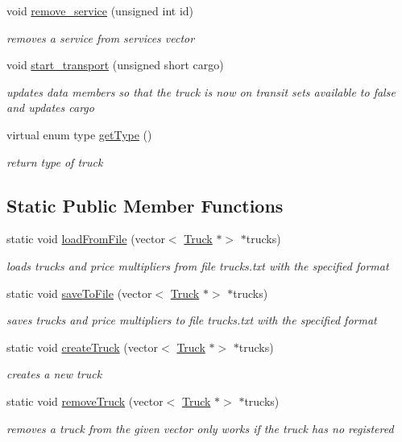 \begin{DoxyCompactItemize}
void \hyperlink{class_truck_a0abc7397fd6dba0eeeb2b5ae3e225fd1}{remove\+\_\+service} (unsigned int id)
\begin{DoxyCompactList}\small\item\em removes a service from services vector \end{DoxyCompactList}\item 
void \hyperlink{class_truck_aca68ecb83bcdc73de6bd381dccb70e4d}{start\+\_\+transport} (unsigned short cargo)
\begin{DoxyCompactList}\small\item\em updates data members so that the truck is now on transit sets available to false and updates cargo \end{DoxyCompactList}\item 
virtual enum type \hyperlink{class_truck_a24406caf4d09be7f3eff069ce6bc015b}{get\+Type} ()
\begin{DoxyCompactList}\small\item\em return type of truck \end{DoxyCompactList}\end{DoxyCompactItemize}
\subsection*{Static Public Member Functions}
\begin{DoxyCompactItemize}
\item 
static void \hyperlink{class_truck_ae2d129e4cdd6760feee9a81421d40e17}{load\+From\+File} (vector$<$ \hyperlink{class_truck}{Truck} $\ast$$>$ $\ast$trucks)
\begin{DoxyCompactList}\small\item\em loads trucks and price multipliers from file trucks.\+txt with the specified format \end{DoxyCompactList}\item 
static void \hyperlink{class_truck_ad03e7d588f7f6dc24e1423e2e481ad3a}{save\+To\+File} (vector$<$ \hyperlink{class_truck}{Truck} $\ast$$>$ $\ast$trucks)
\begin{DoxyCompactList}\small\item\em saves trucks and price multipliers to file trucks.\+txt with the specified format \end{DoxyCompactList}\item 
static void \hyperlink{class_truck_a4b2a202b4fe0bf70249493a9aa30f5dd}{create\+Truck} (vector$<$ \hyperlink{class_truck}{Truck} $\ast$$>$ $\ast$trucks)
\begin{DoxyCompactList}\small\item\em creates a new truck \end{DoxyCompactList}\item 
static void \hyperlink{class_truck_acb3e375dfa4ba812de7e65f0b3e37ded}{remove\+Truck} (vector$<$ \hyperlink{class_truck}{Truck} $\ast$$>$ $\ast$trucks)
\begin{DoxyCompactList}\small\item\em removes a truck from the given vector only works if the truck has no registered \end{DoxyCompactList}\end{DoxyCompactItemize}
